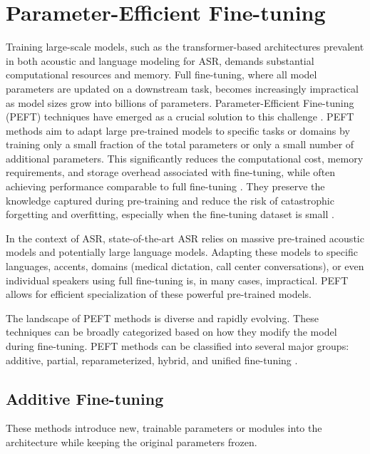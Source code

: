 \section{Parameter-Efficient Fine-tuning}\label{sec:peft}

Training large-scale models, such as the transformer-based architectures prevalent in both acoustic and language modeling for ASR, demands substantial computational resources and memory. Full fine-tuning, where all model parameters are updated on a downstream task, becomes increasingly impractical as model sizes grow into billions of parameters. Parameter-Efficient Fine-tuning (PEFT) techniques have emerged as a crucial solution to this challenge \cite{ding2023parameter}. PEFT methods aim to adapt large pre-trained models to specific tasks or domains by training only a small fraction of the total parameters or only a small number of additional parameters. This significantly reduces the computational cost, memory requirements, and storage overhead associated with fine-tuning, while often achieving performance comparable to full fine-tuning \cite{lialin2023scaling}. They preserve the knowledge captured during pre-training and reduce the risk of catastrophic forgetting and overfitting, especially when the fine-tuning dataset is small \cite{xu2023parameterefficient}.

In the context of ASR, state-of-the-art ASR relies on massive pre-trained acoustic models and potentially large language models. Adapting these models to specific languages, accents, domains (medical dictation, call center conversations), or even individual speakers using full fine-tuning is, in many cases, impractical. PEFT allows for efficient specialization of these powerful pre-trained models.


The landscape of PEFT methods is diverse and rapidly evolving. These techniques can be broadly categorized based on how they modify the model during fine-tuning. PEFT methods can be classified into several major groups: additive, partial, reparameterized, hybrid, and unified fine-tuning \cite{xu2023parameterefficient}.


\subsection{Additive Fine-tuning}
These methods introduce new, trainable parameters or modules into the architecture while keeping the original parameters frozen.

